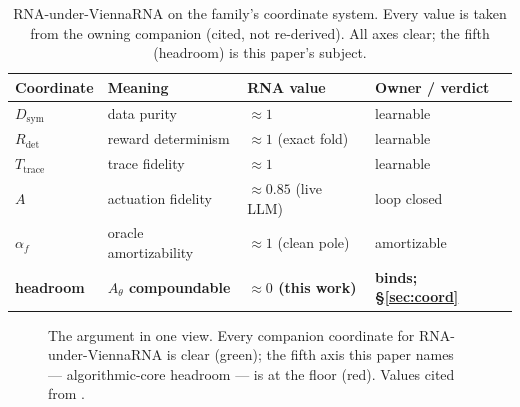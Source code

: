 \documentclass[11pt]{article}
\newcommand{\Dsym}{D_{\mathrm{sym}}}
\newcommand{\Rdet}{R_{\mathrm{det}}}
\newcommand{\Ttrace}{T_{\mathrm{trace}}}
\newcommand{\Ath}{A_{\theta}}
\newcommand{\af}{\alpha_f}
\begin{document}
\begin{table}[t]\centering\small
\caption{RNA-under-ViennaRNA on the family's coordinate system. Every value is taken from the owning
companion (cited, not re-derived). All axes clear; the fifth (headroom) is this paper's subject.}
\label{tab:coords}
\begin{tabular}{@{}llll@{}}
\toprule
Coordinate & Meaning & RNA value & Owner / verdict\\
\midrule
$\Dsym$ & data purity & $\approx 1$ & \citep{determinismmanifold} \;learnable\\
$\Rdet$ & reward determinism & $\approx 1$ (exact fold) & \citep{determinismmanifold} \;learnable\\
$\Ttrace$ & trace fidelity & $\approx 1$ & \citep{determinismmanifold} \;learnable\\
$A$ & actuation fidelity & $\approx 0.85$ (live LLM) & \citep{actuation} \;loop closed\\
$\af$ & oracle amortizability & $\approx 1$ (clean pole) & \citep{oracleresidue} \;amortizable\\[2pt]
\rowcolor{cno}\textbf{headroom} & \textbf{$\Ath$ compoundable} & \textbf{$\approx 0$ (this work)} & \textbf{binds; \S\ref{sec:coord}}\\
\bottomrule
\end{tabular}
\end{table}

\begin{figure}[t]\centering
{}
\caption{The argument in one view. Every companion coordinate for RNA-under-ViennaRNA is clear (green);
the fifth axis this paper names --- algorithmic-core headroom --- is at the floor (red). Values cited
from \citet{determinismmanifold,actuation,oracleresidue}.}
\label{fig:coords}
\end{figure}
\end{document}
